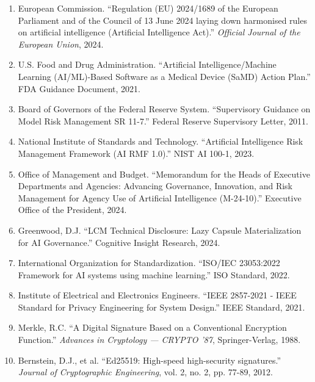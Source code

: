 \documentclass[12pt,a4paper]{article}
\begin{document}
\begin{enumerate}
\item European Commission. ``Regulation (EU) 2024/1689 of the European Parliament and of the Council of 13 June 2024 laying down harmonised rules on artificial intelligence (Artificial Intelligence Act).'' \textit{Official Journal of the European Union}, 2024.

\item U.S. Food and Drug Administration. ``Artificial Intelligence/Machine Learning (AI/ML)-Based Software as a Medical Device (SaMD) Action Plan.'' FDA Guidance Document, 2021.

\item Board of Governors of the Federal Reserve System. ``Supervisory Guidance on Model Risk Management SR 11-7.'' Federal Reserve Supervisory Letter, 2011.

\item National Institute of Standards and Technology. ``Artificial Intelligence Risk Management Framework (AI RMF 1.0).'' NIST AI 100-1, 2023.

\item Office of Management and Budget. ``Memorandum for the Heads of Executive Departments and Agencies: Advancing Governance, Innovation, and Risk Management for Agency Use of Artificial Intelligence (M-24-10).'' Executive Office of the President, 2024.

\item Greenwood, D.J. ``LCM Technical Disclosure: Lazy Capsule Materialization for AI Governance.'' Cognitive Insight Research, 2024.

\item International Organization for Standardization. ``ISO/IEC 23053:2022 Framework for AI systems using machine learning.'' ISO Standard, 2022.

\item Institute of Electrical and Electronics Engineers. ``IEEE 2857-2021 - IEEE Standard for Privacy Engineering for System Design.'' IEEE Standard, 2021.

\item Merkle, R.C. ``A Digital Signature Based on a Conventional Encryption Function.'' \textit{Advances in Cryptology — CRYPTO '87}, Springer-Verlag, 1988.

\item Bernstein, D.J., et al. ``Ed25519: High-speed high-security signatures.'' \textit{Journal of Cryptographic Engineering}, vol. 2, no. 2, pp. 77-89, 2012.
\end{enumerate}
\end{document}
